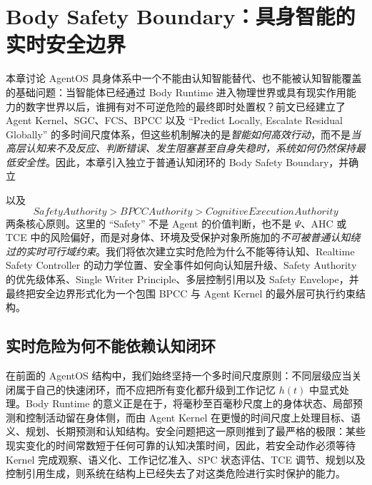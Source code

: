 \chapter{Body Safety Boundary：具身智能的实时安全边界}
\label{chap:body_safety_boundary}

\begin{chapterlead}
本章讨论 AgentOS 具身体系中一个不能由认知智能替代、也不能被认知智能覆盖的基础问题：当智能体已经通过 Body Runtime 进入物理世界或具有现实作用能力的数字世界以后，谁拥有对不可逆危险的最终即时处置权？前文已经建立了 Agent Kernel、SGC、FCS、BPCC 以及 ``Predict Locally, Escalate Residual Globally'' 的多时间尺度体系，但这些机制解决的是\emph{智能如何高效行动}，而不是\emph{当高层认知来不及反应、判断错误、发生阻塞甚至自身失稳时，系统如何仍然保持最低安全性}。因此，本章引入独立于普通认知闭环的 Body Safety Boundary，并确立
\begin{statementbox}
\centering
{}
\end{statementbox}
以及
\[
\boxed{
SafetyAuthority > BPCCAuthority > CognitiveExecutionAuthority
}
\]
两条核心原则。这里的 ``Safety'' 不是 Agent 的价值判断，也不是 $\Psi$、AHC 或 TCE 中的风险偏好，而是对身体、环境及受保护对象所施加的\emph{不可被普通认知绕过的实时可行域约束}。我们将依次建立实时危险为什么不能等待认知、Realtime Safety Controller 的动力学位置、安全事件如何向认知层升级、Safety Authority 的优先级体系、Single Writer Principle、多层控制引用以及 Safety Envelope，并最终把安全边界形式化为一个包围 BPCC 与 Agent Kernel 的最外层可执行约束结构。
\end{chapterlead}


\section{实时危险为何不能依赖认知闭环}

在前面的 AgentOS 结构中，我们始终坚持一个多时间尺度原则：不同层级应当关闭属于自己的快速闭环，而不应把所有变化都升级到工作记忆 $h(t)$ 中显式处理。Body Runtime 的意义正是在于，将毫秒至百毫秒尺度上的身体状态、局部预测和控制活动留在身体侧，而由 Agent Kernel 在更慢的时间尺度上处理目标、语义、规划、长期预测和认知结构。安全问题把这一原则推到了最严格的极限：某些现实变化的时间常数短于任何可靠的认知决策时间，因此，若安全动作必须等待 Kernel 完成观察、语义化、工作记忆准入、SPC 状态评估、TCE 调节、规划以及控制引用生成，则系统在结构上已经失去了对这类危险进行实时保护的能力。

